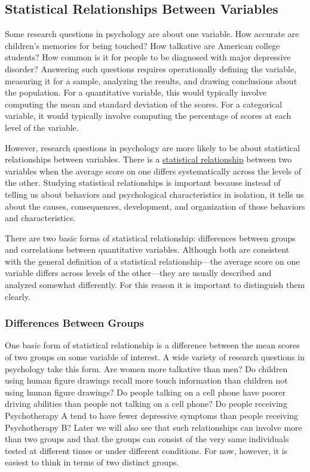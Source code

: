 \documentclass[
]{krantz}
\begin{document}
\hypertarget{statistical-relationships-between-variables}{%
\subsection*{Statistical Relationships Between Variables}\label{statistical-relationships-between-variables}}


Some research questions in psychology are about one variable. How accurate are children's memories for being touched? How talkative are American college students? How common is it for people to be diagnosed with major depressive disorder? Answering such questions requires operationally defining the variable, measuring it for a sample, analyzing the results, and drawing conclusions about the population. For a quantitative variable, this would typically involve computing the mean and standard deviation of the scores. For a categorical variable, it would typically involve computing the percentage of scores at each level of the variable.

However, research questions in psychology are more likely to be about statistical relationships between variables. There is a \protect\hyperlink{statistical-relationship}{statistical relationship} between two variables when the average score on one differs systematically across the levels of the other. Studying statistical relationships is important because instead of telling us about behaviors and psychological characteristics in isolation, it tells us about the causes, consequences, development, and organization of those behaviors and characteristics.

There are two basic forms of statistical relationship: differences between groups and correlations between quantitative variables. Although both are consistent with the general definition of a statistical relationship---the average score on one variable differs across levels of the other---they are usually described and analyzed somewhat differently. For this reason it is important to distinguish them clearly.

\hypertarget{differences-between-groups}{%
\subsubsection*{Differences Between Groups}\label{differences-between-groups}}


One basic form of statistical relationship is a difference between the mean scores of two groups on some variable of interest. A wide variety of research questions in psychology take this form. Are women more talkative than men? Do children using human figure drawings recall more touch information than children not using human figure drawings? Do people talking on a cell phone have poorer driving abilities than people not talking on a cell phone? Do people receiving Psychotherapy A tend to have fewer depressive symptoms than people receiving Psychotherapy B? Later we will also see that such relationships can involve more than two groups and that the groups can consist of the very same individuals tested at different times or under different conditions. For now, however, it is easiest to think in terms of two distinct groups.
\end{document}

